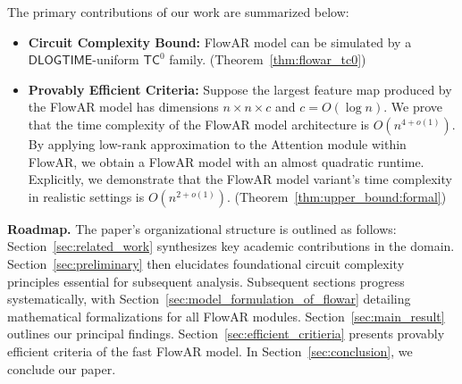 The primary contributions of our work are summarized below:
\begin{itemize}
    \item {\bf Circuit Complexity Bound:} FlowAR model can be simulated by a $\mathsf{DLOGTIME}$-uniform $\mathsf{TC}^0$ family. (Theorem~\ref{thm:flowar_tc0})
    \item {\bf Provably Efficient Criteria:} Suppose the largest feature map produced by the FlowAR model has dimensions $n \times n \times c$ and $c = O(\log n)$. We prove that the time complexity of the FlowAR model architecture is $
    O(n^{4+o(1)})$. By applying low-rank approximation to the Attention module within FlowAR, we obtain a FlowAR model with an almost quadratic runtime. Explicitly, we demonstrate that the FlowAR model variant's time complexity in realistic settings is $O(n^{2+o(1)})$. (Theorem~\ref{thm:upper_bound:formal})
\end{itemize}

{\bf Roadmap.} 
The paper's organizational structure is outlined as follows: Section~\ref{sec:related_work} synthesizes key academic contributions in the domain. Section~\ref{sec:preliminary} then elucidates foundational circuit complexity principles essential for subsequent analysis. Subsequent sections progress systematically, with Section~\ref{sec:model_formulation_of_flowar} detailing mathematical formalizations for all FlowAR modules. Section~\ref{sec:main_result} outlines our principal findings. 
Section~\ref{sec:efficient_critieria} presents provably efficient criteria of the fast FlowAR model.
In Section~\ref{sec:conclusion}, we conclude our paper.